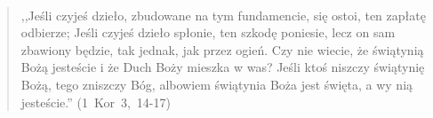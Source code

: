 \documentclass[10pt,a4paper,oneside]{article}
\begin{document}
\paragraph{}
\begin{quote}
,,Jeśli czyjeś dzieło, zbudowane na tym fundamencie, się ostoi, ten zapłatę odbierze; Jeśli czyjeś dzieło spłonie, ten szkodę poniesie, lecz on sam zbawiony będzie, tak jednak, jak przez ogień. Czy nie wiecie, że świątynią Bożą jesteście i że Duch Boży mieszka w was? Jeśli ktoś niszczy świątynię Bożą, tego zniszczy Bóg, albowiem świątynia Boża jest święta, a wy nią jesteście.'' \mbox{(1 Kor 3, 14-17)}
\end{quote}
\end{document}
